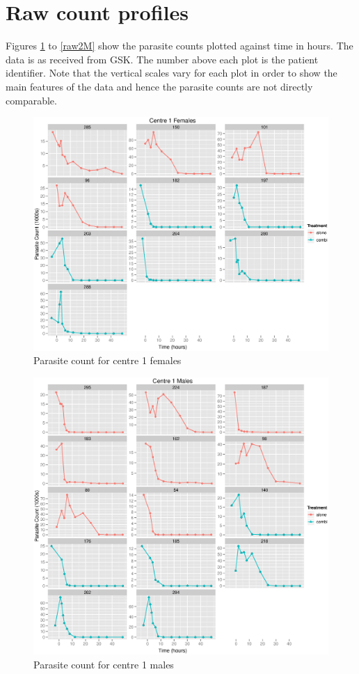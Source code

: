 \section{Raw count profiles}
Figures \ref{raw1F} to \ref{raw2M} show the parasite counts plotted against time in hours. The data is as received from GSK. The number above each plot is the patient identifier. Note that the vertical scales vary for each plot in order to show the main features of the data and hence the parasite counts are not directly comparable.
\begin{figure}[h]
\centering
\includegraphics[width=6.1in]{raw1f.eps}
\caption{Parasite count for centre 1 females}\label{raw1F}
\end{figure} 
\begin{figure}[h]
\centering
\includegraphics[width=6.1in]{raw1m.eps}
\caption{Parasite count for centre 1 males}\label{raw1M}
\end{figure} 
